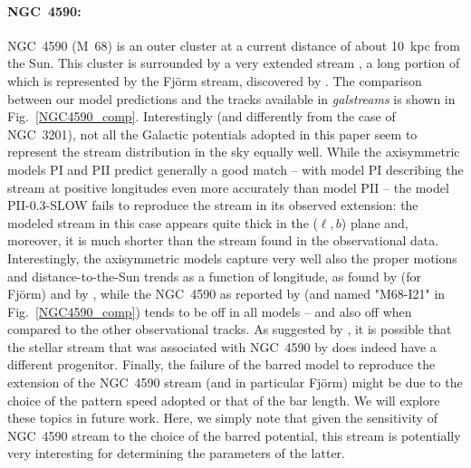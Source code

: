             \paragraph{NGC~4590: } NGC~4590 (M~68) is an outer cluster at a current distance of about 10~kpc from the Sun. This cluster is surrounded by a very extended stream \citep{2019MNRAS.488.1535P, 2021ApJ...914..123I}, a long portion of which is represented by the Fj\"{o}rm stream, discovered by \citet{ibata19b}. The comparison between our model predictions and the tracks available in \textit{galstreams} is shown in Fig.~\ref{NGC4590_comp}. Interestingly (and differently from the case of NGC~3201), not all the Galactic potentials adopted in this paper seem to represent the stream distribution in the sky equally well. While the axisymmetric models PI and PII predict generally a good match -- with model PI describing the stream at positive longitudes even more accurately than model PII -- the model PII-0.3-SLOW fails to reproduce the stream in its observed extension: the modeled stream in this case appears quite thick in the ($\ell, b$) plane and, moreover, it is much shorter than the stream found in the observational data. Interestingly, the axisymmetric models capture very well also the proper motions and distance-to-the-Sun trends as a function of longitude, as found by \citet{2021ApJ...914..123I} (for  Fj\"{o}rm) and by \citet{2019MNRAS.488.1535P}, while the NGC~4590 as reported by \citet{2021ApJ...914..123I} (and named "M68-I21" in Fig.~\ref{NGC4590_comp}) tends to be off in all models -- and also off when compared to the other observational tracks. As suggested by \citet{2023MNRAS.520.5225M}, it is possible that the stellar stream that was associated with NGC~4590   by  \citet{2021ApJ...914..123I}does indeed have a different progenitor.  Finally, the failure of the barred model to reproduce the extension of the NGC~4590 stream (and in particular Fj\"{o}rm)  might be due to the choice of the pattern speed adopted or that of the bar length. We will explore these topics in future work. Here, we simply note that given the sensitivity of NGC~4590 stream to the choice of the barred potential, this stream is potentially very interesting for determining the parameters of the latter. 

